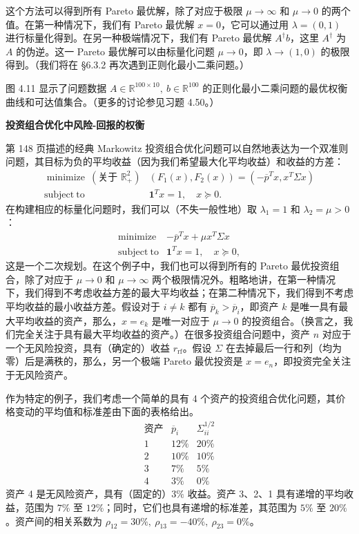 \documentclass[UTF8, 12pt, fontset=fandol, oneside]{ctexart}
\begin{document}
这个方法可以得到所有 Pareto 最优解，除了对应于极限 $\mu\to\infty$ 和 $\mu\to 0$ 的两个值。在第一种情况下，我们有 Pareto 最优解 $x=0$，它可以通过用 $\lambda=(0,1)$ 进行标量化得到。在另一种极端情况下，我们有 Pareto 最优解 $A^\dagger b$，这里 $A^\dagger$ 为 $A$ 的伪逆。这一 Pareto 最优解可以由标量化问题 $\mu\to 0$，即 $\lambda\to(1,0)$ 的极限得到。（我们将在 \S 6.3.2 再次遇到正则化最小二乘问题。）

图 4.11 显示了问题数据 $A\in\mathbb{R}^{100\times 10},\ b\in\mathbb{R}^{100}$ 的正则化最小二乘问题的最优权衡曲线和可达值集合。（更多的讨论参见习题 4.50。）

\noindent\textbf{投资组合优化中风险-回报的权衡}

第 148 页描述的经典 Markowitz 投资组合优化问题可以自然地表达为一个双准则问题，其目标为负的平均收益（因为我们希望最大化平均收益）和收益的方差：
\[
\begin{array}{ll}
\mathop{\mathrm{minimize}}\ (\text{关于 }\mathbb{R}_+^2) & (F_1(x),F_2(x))=(-\overline{p}^Tx,x^T\Sigma x)\\
\mathrm{subject\ to} & \mathbf{1}^Tx=1,\quad x\succeq 0.
\end{array}
\]
在构建相应的标量化问题时，我们可以（不失一般性地）取 $\lambda_1=1$ 和 $\lambda_2=\mu>0$：
\[
\begin{array}{ll}
\mathop{\mathrm{minimize}} & -\overline{p}^Tx+\mu x^T\Sigma x\\
\mathrm{subject\ to} & \mathbf{1}^Tx=1,\quad x\succeq 0,
\end{array}
\]
这是一个二次规划。在这个例子中，我们也可以得到所有的 Pareto 最优投资组合，除了对应于 $\mu\to 0$ 和 $\mu\to\infty$ 两个极限情况外。粗略地讲，在第一种情况下，我们得到不考虑收益方差的最大平均收益；在第二种情况下，我们得到不考虑平均收益的最小收益方差。假设对于 $i\neq k$ 都有 $\overline{p}_k>\overline{p}_i$，即资产 $k$ 是唯一具有最大平均收益的资产，那么，$x=e_k$ 是唯一对应于 $\mu\to 0$ 的投资组合。（换言之，我们完全关注于具有最大平均收益的资产。）在很多投资组合问题中，资产 $n$ 对应于一个无风险投资，具有（确定的）收益 $r_{\mathrm{rf}}$。假设 $\Sigma$ 在去掉最后一行和列（均为零）后是满秩的，那么，另一个极端 Pareto 最优投资是 $x=e_n$，即投资完全关注于无风险资产。

作为特定的例子，我们考虑一个简单的具有 4 个资产的投资组合优化问题，其价格变动的平均值和标准差由下面的表格给出。
\[
\begin{array}{c|cc}
\text{资产} & \overline{p}_i & \Sigma_{ii}^{1/2}\\
\hline
1 & 12\% & 20\%\\
2 & 10\% & 10\%\\
3 & 7\% & 5\%\\
4 & 3\% & 0\%
\end{array}
\]
资产 4 是无风险资产，具有（固定的）$3\%$ 收益。资产 3、2、1 具有递增的平均收益，范围为 $7\%$ 至 $12\%$；同时，它们也具有递增的标准差，其范围为 $5\%$ 至 $20\%$。资产间的相关系数为 $\rho_{12}=30\%,\ \rho_{13}=-40\%,\ \rho_{23}=0\%$。
\end{document}
